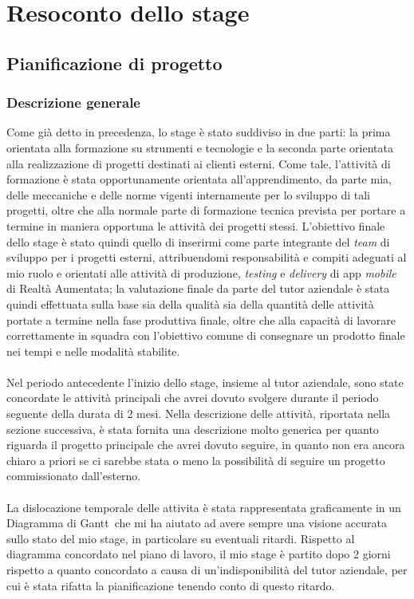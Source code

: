 \section{Resoconto dello stage}
\subsection{Pianificazione di progetto}
\subsubsection{Descrizione generale}
Come gi\`a detto in precedenza, lo stage \`e stato suddiviso in due parti: la prima orientata alla formazione su strumenti e tecnologie e la seconda parte orientata alla realizzazione di progetti destinati ai clienti esterni. Come tale, l’attività di formazione \`e stata opportunamente orientata all’apprendimento, da parte mia, delle meccaniche e delle norme vigenti internamente per lo sviluppo di tali progetti, oltre che alla normale parte di formazione tecnica prevista per portare a termine in maniera opportuna le attività dei progetti stessi.
L’obiettivo finale dello stage \`e stato quindi quello di inserirmi come parte integrante del \textit{team} di sviluppo per i progetti esterni, attribuendomi responsabilità e compiti adeguati al mio ruolo e orientati alle attività di produzione, \textit{testing} e \textit{delivery} di app \textit{mobile} di Realtà Aumentata; la valutazione finale da parte del tutor aziendale \`e stata quindi effettuata sulla base sia della qualità sia della quantità delle attività portate a termine nella fase produttiva finale, oltre che alla capacità di lavorare correttamente in squadra con l’obiettivo comune di consegnare un prodotto finale nei tempi e nelle modalità stabilite.
\\\\
Nel periodo antecedente l'inizio dello stage, insieme al tutor aziendale, sono state concordate le attivit\`a principali che avrei dovuto svolgere durante il periodo seguente della durata di 2 mesi. Nella descrizione delle attivit\`a, riportata nella sezione successiva, \`e stata fornita una descrizione molto generica per quanto riguarda il progetto principale che avrei dovuto seguire, in quanto non era ancora chiaro a priori se ci sarebbe stata o meno la possibilit\`a di seguire un progetto commissionato dall'esterno.
\\\\
La dislocazione temporale delle attivita \`e stata rappresentata graficamente in un Diagramma di Gantt\gloss\ che mi ha aiutato ad avere sempre una visione accurata sullo stato del mio stage, in particolare su eventuali ritardi. Rispetto al diagramma concordato nel piano di lavoro, il mio stage \`e partito dopo 2 giorni rispetto a quanto concordato a causa di un'indisponibilit\`a del tutor aziendale, per cui \`e stata rifatta la pianificazione tenendo conto di questo ritardo.

